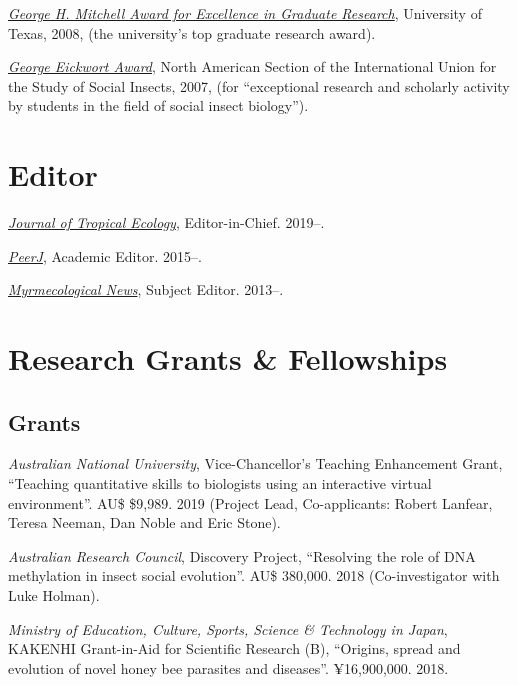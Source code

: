 \documentclass[11pt]{article}
\def\printdate#1{\xprintdate#1-}
\def\xprintdate#1-#2-#3-{#1}
\begin{document}
\ind \textit{\href{https://news.utexas.edu/2008/05/29/graduate-students-honored-for-excellence}{George H. Mitchell Award for Excellence in Graduate Research}}, University of Texas, 2008, (the university's top graduate research award).

\ind \textit{\href{http://iussi.cyberbee.net/wp-content/uploads/2010/04/2007\_Fall\_NAS-IUSSI\_Newsletter.pdf}{George Eickwort Award}}, North American Section of the International Union for the Study of
Social Insects, 2007, (for ``exceptional research and scholarly activity by students in the
field of social insect biology'').


\section{Editor}

\ind \textit{\href{https://mc.manuscriptcentral.com/jte}{Journal of Tropical Ecology}}, Editor-in-Chief. \printdate{2019-07-01}--.

\ind \textit{\href{https://peerj.com/sasha/}{PeerJ}}, Academic Editor. \printdate{2015-00-00}--.

\ind \textit{\href{http://openlogicproject.org/}{Myrmecological News}}, Subject Editor. \printdate{2013-00-00}--.


\section{Research Grants \& Fellowships}

\subsection{Grants}
\ind \textit{Australian National University}, Vice-Chancellor's Teaching Enhancement Grant, ``Teaching quantitative skills to biologists using an interactive virtual
environment''.  AU\$ \$9,989. 2019 (Project Lead, Co-applicants: Robert Lanfear, Teresa Neeman, Dan Noble
and Eric Stone).



\ind \textit{Australian Research Council}, Discovery Project, ``Resolving the role of DNA methylation in insect social evolution''.  AU\$ 380,000. 2018 (Co-investigator with Luke Holman).


\ind \textit{Ministry of Education, Culture, Sports, Science \& Technology in Japan}, KAKENHI Grant-in-Aid for Scientific Research (B), ``Origins, spread and evolution of novel honey bee parasites and diseases''.  ¥16,900,000. 2018.
\end{document}
